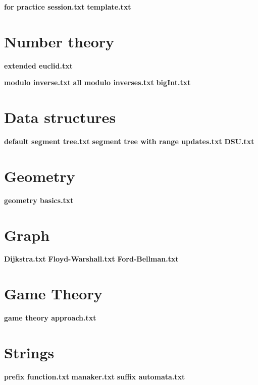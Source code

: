 \documentclass[a4paper]{article}
\newcommand{\AddSection}[1]{\textbf{#1} }
\begin{document}
\AddSection{for practice session.txt}
\AddSection{template.txt}

\section{Number theory} 

\AddSection{extended euclid.txt}

\AddSection{modulo inverse.txt}
\AddSection{all modulo inverses.txt}
\AddSection{bigInt.txt}

\section{Data structures}

\AddSection{default segment tree.txt}
\AddSection{segment tree with range updates.txt}
\AddSection{DSU.txt}


\section{Geometry}
\AddSection{geometry basics.txt}

\section{Graph}
\AddSection{Dijkstra.txt}
\AddSection{Floyd-Warshall.txt}
\AddSection{Ford-Bellman.txt}
\section{Game Theory}
\AddSection{game theory approach.txt}

\section{Strings}
\AddSection{prefix function.txt}
\AddSection{manaker.txt}
\AddSection{suffix automata.txt}
\end{document}
